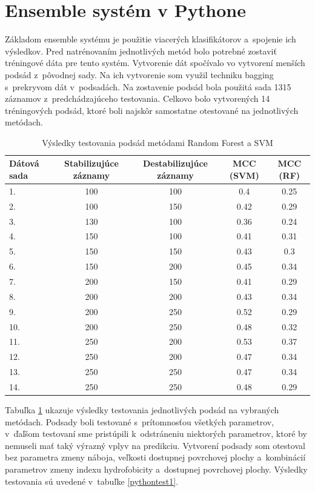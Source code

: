 \section{Ensemble systém v Pythone}

Základom ensemble systému je použitie viacerých klasifikátorov a~spojenie ich výsledkov. Pred natrénovaním jednotlivých metód bolo potrebné zostaviť tréningové dáta pre tento systém. Vytvorenie dát spočívalo vo vytvorení menších podsád z~pôvodnej sady. Na ich vytvorenie som využil techniku bagging s~prekryvom dát v~podsadách. Na zostavenie podsád bola použitá sada 1315 záznamov z~predchádzajúceho testovania. Celkovo bolo vytvorených 14 tréningových podsád, ktoré boli najskôr samostatne otestované na jednotlivých metódach. 
  
\begin{table}[H]
	\centering
	\begin{tabular}{ |l | c | c | c | c|}
		\hline 
		Dátová sada & Stabilizujúce záznamy & Destabilizujúce záznamy & MCC (SVM) & MCC (RF)  \\ \hline
	1. & 100 & 100 & 0.4 & 0.25\\ \hline
	2. & 100 & 150 & 0.42 & 0.29\\ \hline
	3. & 130 & 100 & 0.36 & 0.24\\ \hline
	4. & 150 & 100 & 0.41 & 0.31\\ \hline
	5. & 150 & 150 & 0.43 & 0.3\\ \hline
	6. & 150 & 200 & 0.45 & 0.34\\ \hline
	7. & 200 & 150 & 0.41 & 0.29\\ \hline
	8. & 200 & 200 & 0.43 & 0.34\\ \hline
	9. & 200 & 250 & 0.52 & 0.29\\ \hline
	10. & 200 & 250 & 0.48 & 0.32\\ \hline
	11. & 250 & 200 & 0.53 & 0.37\\ \hline
	12. & 250 & 200 & 0.47 & 0.34\\ \hline
	13. & 250 & 250 & 0.47 & 0.34\\ \hline
	14. & 250 & 250 & 0.48 & 0.29\\ \hline
	\end{tabular}
	\caption {Výsledky testovania podsád metódami Random Forest a SVM} \label{pythontest} 
\end{table}

Tabuľka \ref{pythontest} ukazuje výsledky testovania jednotlivých podsád na vybraných metódach. Podsady boli testované s~prítomnosťou všetkých parametrov, v~ďaľšom testovaní sme pristúpili k~odstráneniu niektorých parametrov, ktoré by nemuseli mať taký výrazný vplyv na predikciu. Vytvorení podsady som otestoval bez parametra zmeny náboja, veľkosti dostupnej povrchovej plochy a~kombinácií parametrov zmeny indexu hydrofobicity a~dostupnej povrchovej plochy. Výsledky testovania sú uvedené v~tabuľke \ref{pythontest1}.

